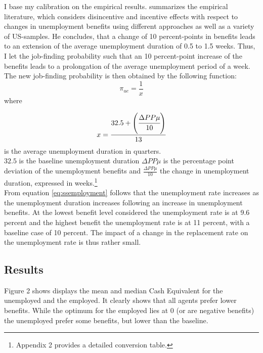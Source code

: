 \documentclass[a4paper,12pt]{article}
\begin{document}
I base my calibration on the empirical results. \citep{decker} summarizes the empirical literature, which considers disincentive and incentive effects with respect to changes in unemployment benefits using different approaches as well as a variety of US-samples. He concludes, that a change of 10 percent-points in benefits leads to an extension of the average unemployment duration of 0.5 to 1.5 weeks. 
Thus, I let the job-finding probability such that an 10 percent-point increase of the benefits leads to a prolongation of the average unemployment period of a week. The new job-finding probability is then obtained by the following function:
\begin{equation}
	\pi_{ue}=\frac{1}{x} \nonumber
\end{equation}
where 

\begin{equation}
	x=\cfrac{32.5+\left(\cfrac{\Delta PP \mu}{10}\right)}{13} \nonumber
\end{equation}
is the average unemployment duration in quarters. \\

$32.5$ is the baseline unemployment duration $\Delta PP \mu$ is the percentage point deviation of the unemployment benefits and $\frac{\Delta PP \mu}{10}$ the change in unemployment duration, expressed in weeks.\footnote{Appendix 2 provides a detailed conversion table.} \\
From equation \eqref{eq:ssemployment} follows that the unemployment rate increases as the unemployment duration increases following an increase in unemployment benefits. At the lowest benefit level considered the unemployment rate is at 9.6 percent and the highest benefit the unemployment rate is at 11 percent, with a baseline case of 10 percent. The impact of a change in the replacement rate on the unemployment rate is thus rather small. 

\subsection{Results}


Figure 2 shows displays the mean and median Cash Equivalent for the unemployed and the employed. It clearly shows that all agents prefer lower benefits. While the optimum for the employed lies at 0 (or are negative benefits) the unemployed prefer some benefits, but lower than the baseline. 
\end{document}
